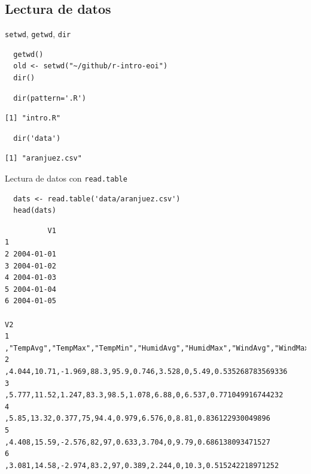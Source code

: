 \documentclass[xcolor={usenames,svgnames,dvipsnames}]{beamer}
\begin{document}
\subsection{Lectura de datos}
\label{sec-5-1}
\begin{frame}[fragile,label=sec-5-1-1]{\texttt{setwd}, \texttt{getwd}, \texttt{dir}}
 \lstset{language=R,label= ,caption= ,numbers=none}
\begin{lstlisting}
  getwd()
  old <- setwd("~/github/r-intro-eoi")
  dir()
\end{lstlisting}

\lstset{language=R,label= ,caption= ,numbers=none}
\begin{lstlisting}
  dir(pattern='.R')
\end{lstlisting}

\begin{verbatim}
[1] "intro.R"
\end{verbatim}

\lstset{language=R,label= ,caption= ,numbers=none}
\begin{lstlisting}
  dir('data')
\end{lstlisting}

\begin{verbatim}
[1] "aranjuez.csv"
\end{verbatim}
\end{frame}

\begin{frame}[fragile,label=sec-5-1-2]{Lectura de datos con \texttt{read.table}}
 \lstset{language=R,label= ,caption= ,numbers=none}
\begin{lstlisting}
  dats <- read.table('data/aranjuez.csv')
  head(dats)
\end{lstlisting}

\begin{verbatim}
          V1
1           
2 2004-01-01
3 2004-01-02
4 2004-01-03
5 2004-01-04
6 2004-01-05
                                                                                                V2
1 ,"TempAvg","TempMax","TempMin","HumidAvg","HumidMax","WindAvg","WindMax","Rain","Radiation","ET"
2                               ,4.044,10.71,-1.969,88.3,95.9,0.746,3.528,0,5.49,0.535268783569336
3                                ,5.777,11.52,1.247,83.3,98.5,1.078,6.88,0,6.537,0.771049916744232
4                                   ,5.85,13.32,0.377,75,94.4,0.979,6.576,0,8.81,0.836122930049896
5                                   ,4.408,15.59,-2.576,82,97,0.633,3.704,0,9.79,0.686138093471527
6                                 ,3.081,14.58,-2.974,83.2,97,0.389,2.244,0,10.3,0.515242218971252
\end{verbatim}
\end{frame}
\end{document}

